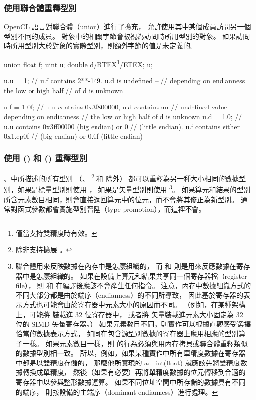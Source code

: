 \subsubsection{使用聯合體重釋型別}

OpenCL 語言對聯合體（union）進行了擴充，
允許使用其中某個成員訪問另一個型別不同的成員。
對象中的相關字節會被視為訪問時所用型別的對象。
如果訪問時所用型別大於對象的實際型別，則額外字節的值是未定義的。

\startexample
\startclc
union{ float f; uint u; double d/BTEX\footnote{僅當支持雙精度時有效。}/ETEX;} u;

u.u = 1;	// u.f contains 2**-149. u.d is undefined --
		// depending on endianness the low or high half
		// of d is unknown

u.f = 1.0f;	// u.u contains 0x3f800000, u.d contains an
		// undefined value -- depending on endianness
		// the low or high half of d is unknown
u.d = 1.0;	// u.u contains 0x3ff00000 (big endian) or 0
		// (little endian). u.f contains either 0x1.ep0f
		// (big endian) or 0.0f (little endian)
\stopclc
\stopexample

\subsubsection{使用 () 和 () 重釋型別}

、中所描述的所有型別
（、 
\footnote{除非支持擴展 。} 和  除外）
都可以重釋為另一種大小相同的數據型別，如果是標量型別則使用 ，
如果是矢量型別則使用 \footnote{
聯合體用來反映數據在內存中是怎麼組織的，
而  和  則是用來反應數據在寄存器中是怎麼組織的。
如果在設備上算元和結果共享同一個寄存器檔（register file），
則  和  在編譯後應該不會產生任何指令。
注意，內存中數據組織方式的不同大部分都是由於端序（endianness）的不同所導致，
因此基於寄存器的表示方式也可能會由於寄存器中元素大小的原因而不同。
（例如，在某種架構上，可能將  裝載進 32 位寄存器中，
或者將  矢量裝載進元素大小固定為 32 位的 SIMD 矢量寄存器。）
如果元素數目不同，則實作可以根據直觀感受選擇恰當的數據表示方式，
如同在包含源型別數據的寄存器上應用相應的型別算子一樣。
如果元素數目一樣，則  的行為必須與用內存拷貝或聯合體重釋類似的數據型別相一致。
所以，例如，如果某種實作中所有單精度數據在寄存器中都是以雙精度存儲的，
那麼他所實現的 as_int(float) 就應該先將雙精度數據轉換成單精度，
然後（如果有必要）再將單精度數據的位元轉移到合適的寄存器中以參與整形數據運算。
如果不同位址空間中所存儲的數據具有不同的端序，
則按設備的主端序（dominant endianness）進行處理。
}。
如果算元和結果的型別所含元素數目相同，則會直接返回算元中的位元，而不會將其修正為新型別。
通常對函式參數都會實施型別晉陞（type promotion），而這裡不會。

